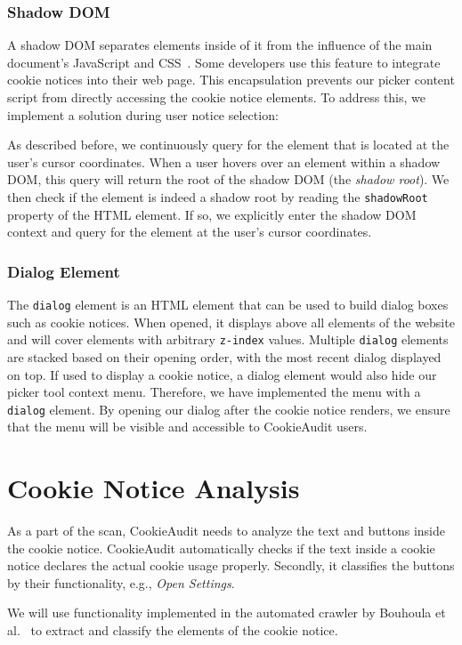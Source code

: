 \subsubsection{Shadow DOM}
A shadow DOM separates elements inside of it from the influence of the main document's JavaScript and CSS~\cite{shadowDomMdn}.
Some developers use this feature to integrate cookie notices into their web page.
This encapsulation prevents our picker content script from directly accessing the cookie notice elements. 
To address this, we implement a solution during user notice selection:

As described before, we continuously query for the element that is located at the user's cursor coordinates.
When a user hovers over an element within a shadow DOM, this query will return the root of the shadow DOM (the \emph{shadow root}). 
We then check if the element is indeed a shadow root by reading the \verb|shadowRoot| property of the HTML element.
If so, we explicitly enter the shadow DOM context and query for the element at the user's cursor coordinates. 


\subsubsection{Dialog Element}
The \verb|dialog| element is an HTML element that can be used to build dialog boxes such as cookie notices.
When opened, it displays above all elements of the website and will cover elements with arbitrary \verb|z-index| values. 
Multiple \verb|dialog| elements are stacked based on their opening order, with the most recent dialog displayed on top.
If used to display a cookie notice, a dialog element would also hide our picker tool context menu.
Therefore, we have implemented the menu with a \verb|dialog| element.
By opening our dialog after the cookie notice renders, we ensure that the menu will be visible and accessible to CookieAudit users.

\section{Cookie Notice Analysis}
As a part of the scan, CookieAudit needs to analyze the text and buttons inside the cookie notice.
CookieAudit automatically checks if the text inside a cookie notice declares the actual cookie usage properly. Secondly, it classifies the buttons by their functionality, e.g., \emph{Open Settings}.

We will use functionality implemented in the automated crawler by Bouhoula et al.~\cite{bouhoula2023automated} to extract and classify the elements of the cookie notice. 

